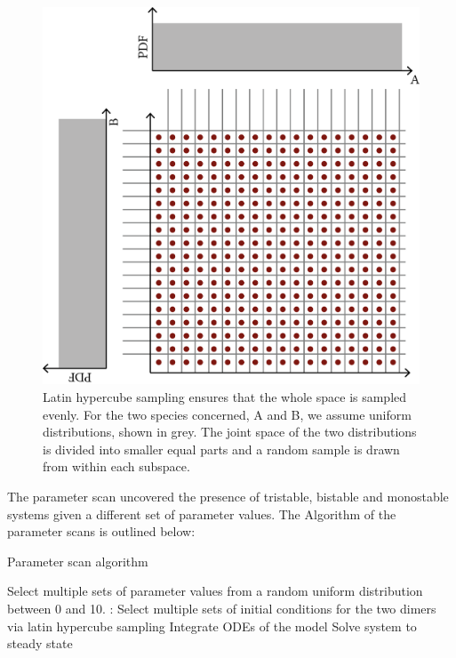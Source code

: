\clearpage
\begin{figure}[tbp]
\begin{center}
\includegraphics[scale=0.5]{../../chapters/chapterABCSysBio/images/LHS.png}
\caption[LoF caption]{\label{fig:lhs}Latin hypercube sampling ensures that the whole space is sampled evenly. For the two species concerned, A and B, we assume uniform distributions, shown in grey. The joint space of the two distributions is divided into smaller equal parts and a random sample is drawn from within each subspace.  }
\end{center}
\end{figure}


The parameter scan uncovered the presence of tristable, bistable and monostable systems given a different set of parameter values. The Algorithm of the parameter scans is outlined below:


\begin{algorithm}[htbp]
\caption{Parameter scan algorithm}
\label{alg:param_scan}
 \begin{algorithmic}[1]
    \Statex
	\State Select multiple sets of parameter values from a random uniform distribution between 0 and 10.
	:
	\State Select multiple sets of initial conditions for the two dimers via latin hypercube sampling
	\State Integrate ODEs of the model
	\State Solve system to steady state
	\EndFor
	\EndFor
  \end{algorithmic} 
\end{algorithm}

